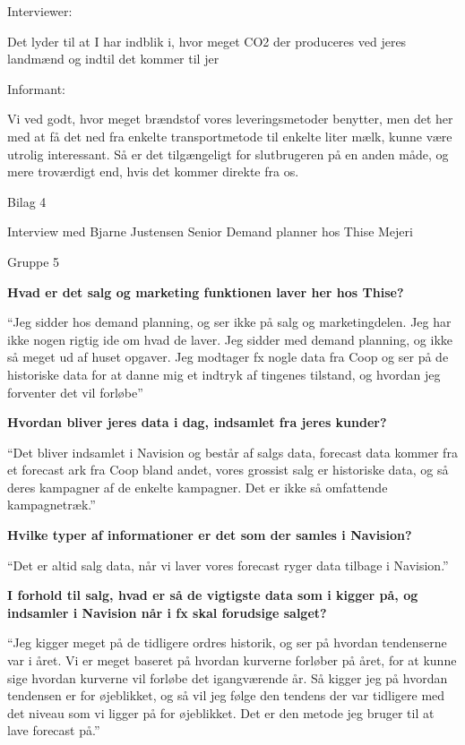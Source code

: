 \documentclass[
  12pt,
  a4paper,
  DIV=11,
  numbers=noendperiod]{scrartcl}
\begin{document}
\begin{itemize}
  Interviewer:~

  Det lyder til at I har indblik i, hvor meget CO2 der produceres ved
  jeres landmænd og indtil det kommer til jer~

  Informant:~~

  Vi ved godt, hvor meget brændstof vores leveringsmetoder benytter, men
  det her med at få det ned fra enkelte transportmetode til enkelte
  liter mælk, kunne være utrolig interessant. Så er det tilgængeligt for
  slutbrugeren på en anden måde, og mere troværdigt end, hvis det kommer
  direkte fra os.~

  Bilag 4~

  Interview med Bjarne Justensen Senior Demand planner hos Thise Mejeri

  Gruppe 5~

  \textbf{Hvad er det salg og marketing funktionen laver her hos Thise?}

  ``Jeg sidder hos demand planning, og ser ikke på salg og
  marketingdelen. Jeg har ikke nogen rigtig ide om hvad de laver. Jeg
  sidder med demand planning, og ikke så meget ud af huset opgaver. Jeg
  modtager fx nogle data fra Coop og ser på de historiske data for at
  danne mig et indtryk af tingenes tilstand, og hvordan jeg forventer
  det vil forløbe''

  \textbf{Hvordan bliver jeres data i dag, indsamlet fra jeres kunder?}

  ``Det bliver indsamlet i Navision og består af salgs data, forecast
  data kommer fra et forecast ark fra Coop bland andet, vores grossist
  salg er historiske data, og så deres kampagner af de enkelte
  kampagner. Det er ikke så omfattende kampagnetræk.''

  \textbf{Hvilke typer af informationer er det som der samles i
  Navision?}

  ``Det er altid salg data, når vi laver vores forecast ryger data
  tilbage i Navision.''

  \textbf{I forhold til salg, hvad er så de vigtigste data som i kigger
  på, og indsamler i Navision når i fx skal forudsige salget?}~

  ``Jeg kigger meget på de tidligere ordres historik, og ser på hvordan
  tendenserne var i året. Vi er meget baseret på hvordan kurverne
  forløber på året, for at kunne sige hvordan kurverne vil forløbe det
  igangværende år. Så kigger jeg på hvordan tendensen er for øjeblikket,
  og så vil jeg følge den tendens der var tidligere med det niveau som
  vi ligger på for øjeblikket. Det er den metode jeg bruger til at lave
  forecast på.''


\end{itemize}
\end{document}
